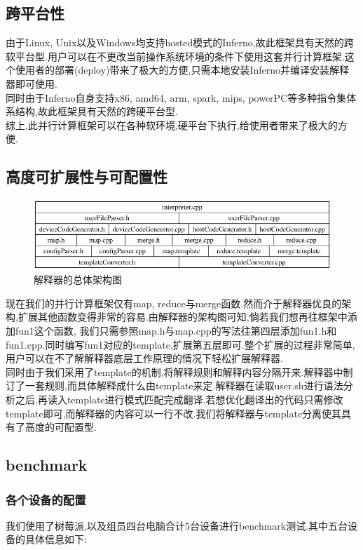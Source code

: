 \documentclass[paper=a4]{ctexart} %
\numberwithin{equation}{section} %
\numberwithin{figure}{section} %
\numberwithin{table}{section} %
\newcommand{\n}{\\\indent}
\begin{document}
\subsection{跨平台性}
由于Linux, Unix以及Windows均支持hosted模式的Inferno,故此框架具有天然的跨软平台型.用户可以在不更改当前操作系统环境的条件下使用这套并行计算框架.这个使用者的部署(deploy)带来了极大的方便,只需本地安装Inferno并编译安装解释器即可使用. \n
同时由于Inferno自身支持x86, amd64, arm, spark, mips, powerPC等多种指令集体系结构,故此框架具有天然的跨硬平台型.\n
综上,此并行计算框架可以在各种软环境,硬平台下执行,给使用者带来了极大的方便.

\subsection{高度可扩展性与可配置性}
\begin{figure}[htbp]
\centering
\includegraphics[width=1\textwidth]{pic/arch.jpg}
\caption{解释器的总体架构图}
\end{figure}
现在我们的并行计算框架仅有map, reduce与merge函数.然而介于解释器优良的架构,扩展其他函数变得非常的容易.由解释器的架构图可知,倘若我们想再往框架中添加fun1这个函数, 我们只需参照map.h与map.cpp的写法往第四层添加fun1.h和fun1.cpp.同时编写fun1对应的template,扩展第五层即可.整个扩展的过程非常简单,用户可以在不了解解释器底层工作原理的情况下轻松扩展解释器.\n
同时由于我们采用了template的机制,将解释规则和解释内容分隔开来.解释器中制订了一套规则,而具体解释成什么由template来定.解释器在读取user.sh进行语法分析之后,再读入template进行模式匹配完成翻译.若想优化翻译出的代码只需修改template即可,而解释器的内容可以一行不改.我们将解释器与template分离使其具有了高度的可配置型.

\subsection{benchmark}

\subsubsection{各个设备的配置}
我们使用了树莓派,以及组员四台电脑合计5台设备进行benchmark测试.其中五台设备的具体信息如下: 
\end{document}
